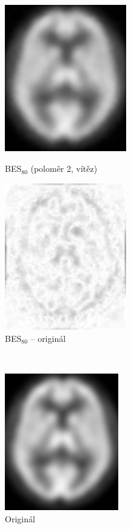     \begin{figure}[h]
        \begin{minipage}[l]{0.5\textwidth}
            \center
            \includegraphics[width = 150pt]{src/8Appendix/final/10-100besL.png}
            \caption{BES$_{80}$ (poloměr 2, vítěz)}
        \end{minipage}
        \begin{minipage}[r]{0.5\textwidth}
            \center
            \includegraphics[width = 150pt]{src/8Appendix/final/10-100besLD.png}
            \caption{BES$_{80}$ -- originál}
        \end{minipage}
    \end{figure}
    ~\vfill~
    \newpage
    \begin{figure}[Htp] %
        \center
        \begin{minipage}[c]{0.5\textwidth}
            \center
            \includegraphics[width = 140pt]{src/8Appendix/final/original.png}
            \caption{Originál}
        \end{minipage}
     \end{figure}\nopagebreak

